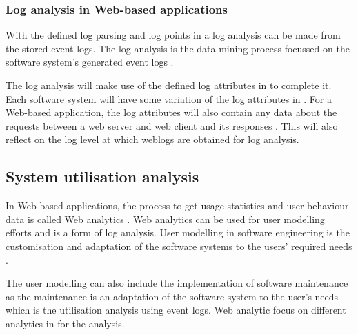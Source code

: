 \subsubsection{Log analysis in Web-based applications}
With the defined log parsing and log points in  a log analysis can be made from the stored event logs. The log analysis is the data mining process focussed on the software system's generated event logs \cite{Slaninova2014}.\par The log analysis will make use of the defined log attributes in  to complete it. Each software system will have some variation of the log attributes in . For a Web-based application, the log attributes will also contain any data about the requests between a web server and web client and its responses \cite{Slaninova2014, Dhanalakshmi2016}. This will also reflect on the log level at which weblogs are obtained for log analysis.


\subsection{System utilisation analysis}\label{sec:ch1_systemUtilisation}
In Web-based applications, the process to get usage statistics and user behaviour data is called Web analytics \cite{Kocsis2012}. Web analytics can be used for user modelling efforts and is a form of log analysis. User modelling in software engineering is the customisation and adaptation of the software systems to the users' required needs \cite{Waqar2017, Paliouras1999}.\par The user modelling can also include the implementation of software maintenance as the maintenance is an adaptation of the software system to the user's needs which is the utilisation analysis using event logs. Web analytic focus on different analytics in  for the analysis. 

